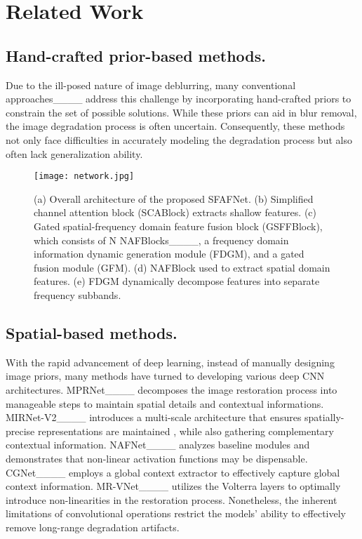 \section{Related Work}
\subsection{Hand-crafted prior-based methods.}
Due to the ill-posed nature of image deblurring, many conventional approaches____ address this challenge by incorporating hand-crafted priors to constrain the set of possible solutions. While these priors can aid in blur removal, the image degradation process is often uncertain. Consequently, these methods not only face difficulties in accurately modeling the degradation process but also often lack generalization ability.

\begin{figure*}
    \centering
    \texttt{[image: network.jpg]}
    \caption{(a) Overall architecture of the proposed SFAFNet. (b) Simplified channel attention block (SCABlock) extracts shallow features.   (c) Gated spatial-frequency domain feature fusion block (GSFFBlock), which consists of N NAFBlocks____, a frequency domain information dynamic generation module (FDGM), and a gated fusion module (GFM). (d) NAFBlock used to extract spatial domain features. (e) FDGM dynamically decompose features into separate frequency subbands.}
    \label{fig:network}
\end{figure*}
\subsection{Spatial-based methods.}
With the rapid advancement of deep learning, instead of manually designing image priors, many methods have turned to developing various deep CNN architectures. MPRNet____ decomposes the image restoration process into manageable steps to maintain spatial details and contextual informations.
MIRNet-V2____ introduces a multi-scale architecture that ensures spatially-precise representations are maintained , while also gathering complementary contextual information.
NAFNet____ analyzes baseline modules and demonstrates that non-linear activation functions may be dispensable.
CGNet____ employs a global context extractor to effectively capture global context information.
MR-VNet____ utilizes the Volterra layers to optimally introduce non-linearities in the restoration process. 
Nonetheless,  the inherent limitations of convolutional operations restrict the models' ability to effectively remove long-range degradation artifacts.

